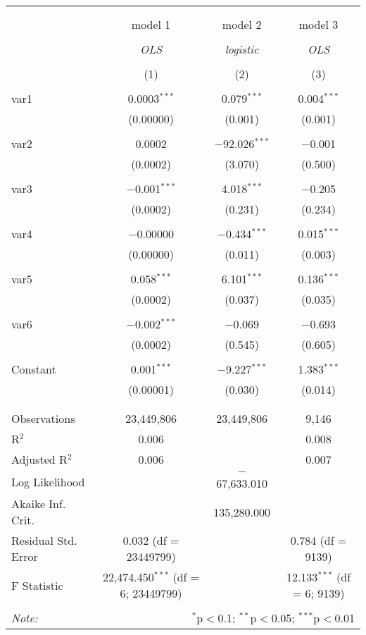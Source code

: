 {
\begin{tabular}{@{\extracolsep{5pt}}lccc}
\\[-1.8ex]\hline
\hline \\[-1.8ex]
\\[-1.8ex] & model 1 & model 2 & model 3 \\
\\[-1.8ex] & \textit{OLS} & \textit{logistic} & \textit{OLS} \\
\\[-1.8ex] & (1) & (2) & (3)\\
\hline \\[-1.8ex]
 var1 & 0.0003$^{***}$ & 0.079$^{***}$ & 0.004$^{***}$ \\
  & (0.00000) & (0.001) & (0.001) \\
  & & & \\
 var2 & 0.0002 & $-$92.026$^{***}$ & $-$0.001 \\
  & (0.0002) & (3.070) & (0.500) \\
  & & & \\
 var3 & $-$0.001$^{***}$ & 4.018$^{***}$ & $-$0.205 \\
  & (0.0002) & (0.231) & (0.234) \\
  & & & \\
 var4 & $-$0.00000 & $-$0.434$^{***}$ & 0.015$^{***}$ \\
  & (0.00000) & (0.011) & (0.003) \\
  & & & \\
 var5 & 0.058$^{***}$ & 6.101$^{***}$ & 0.136$^{***}$ \\
  & (0.0002) & (0.037) & (0.035) \\
  & & & \\
 var6 & $-$0.002$^{***}$ & $-$0.069 & $-$0.693 \\
  & (0.0002) & (0.545) & (0.605) \\
  & & & \\
 Constant & 0.001$^{***}$ & $-$9.227$^{***}$ & 1.383$^{***}$ \\
  & (0.00001) & (0.030) & (0.014) \\
  & & & \\
\hline \\[-1.8ex]
Observations & 23,449,806 & 23,449,806 & 9,146 \\
R$^{2}$ & 0.006 &  & 0.008 \\
Adjusted R$^{2}$ & 0.006 &  & 0.007 \\
Log Likelihood &  & $-$67,633.010 &  \\
Akaike Inf. Crit. &  & 135,280.000 &  \\
Residual Std. Error & 0.032 (df = 23449799) &  & 0.784 (df = 9139) \\
F Statistic & 22,474.450$^{***}$ (df = 6; 23449799) &  & 12.133$^{***}$ (df = 6; 9139) \\
\hline
\hline \\[-1.8ex]
\textit{Note:}  & \multicolumn{3}{r}{$^{*}$p$<$0.1; $^{**}$p$<$0.05; $^{***}$p$<$0.01} \\
\end{tabular}
}
